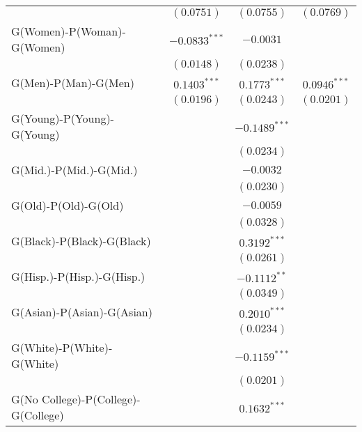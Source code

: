 \begin{center}
\begin{longtable}{l c c c}
                                    & $(0.0751)$      & $(0.0755)$      & $(0.0769)$      \\
G(Women)-P(Woman)-G(Women)          & $-0.0833^{***}$ & $-0.0031$       &                 \\
                                    & $(0.0148)$      & $(0.0238)$      &                 \\
G(Men)-P(Man)-G(Men)                & $0.1403^{***}$  & $0.1773^{***}$  & $0.0946^{***}$  \\
                                    & $(0.0196)$      & $(0.0243)$      & $(0.0201)$      \\
G(Young)-P(Young)-G(Young)          &                 & $-0.1489^{***}$ &                 \\
                                    &                 & $(0.0234)$      &                 \\
G(Mid.)-P(Mid.)-G(Mid.)             &                 & $-0.0032$       &                 \\
                                    &                 & $(0.0230)$      &                 \\
G(Old)-P(Old)-G(Old)                &                 & $-0.0059$       &                 \\
                                    &                 & $(0.0328)$      &                 \\
G(Black)-P(Black)-G(Black)          &                 & $0.3192^{***}$  &                 \\
                                    &                 & $(0.0261)$      &                 \\
G(Hisp.)-P(Hisp.)-G(Hisp.)          &                 & $-0.1112^{**}$  &                 \\
                                    &                 & $(0.0349)$      &                 \\
G(Asian)-P(Asian)-G(Asian)          &                 & $0.2010^{***}$  &                 \\
                                    &                 & $(0.0234)$      &                 \\
G(White)-P(White)-G(White)          &                 & $-0.1159^{***}$ &                 \\
                                    &                 & $(0.0201)$      &                 \\
G(No College)-P(College)-G(College) &                 & $0.1632^{***}$  &                 \\

\end{longtable}
\end{center}
